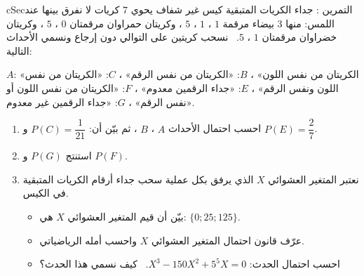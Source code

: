 \documentclass[12pt,a4paper]{article}
\newenvironment{BOX}[2]{\begin{otherlanguage}{english}\begin{arbox}{#1}{#2}}{\end{arbox}\end{otherlanguage}}
\newcounter{exo}
\newenvironment{tamrin}[1]{\stepcounter{exo}\begin{BOX}{cSec}{التمرين \theexo: #1}}{\end{BOX}}
\newenvironment{sq}{\begin{itemize}[leftmargin=2.4em,itemsep=3pt]}{\end{itemize}}
\newcommand{\qa}{\item[(أ)]}\newcommand{\qb}{\item[(ب)]}\newcommand{\qc}{\item[(جـ)]}\newcommand{\qd}{\item[(د)]}\newcommand{\qe}{\item[(هـ)]}
\begin{document}
\begin{tamrin}{جداء الكريات المتبقية}
كيس غير شفاف يحوي $7$ كريات لا نفرق بينها عند اللمس: منها $3$ بيضاء مرقمة $1$ ، $1$ ، $5$ ، وكريتان حمراوان مرقمتان $0$ ، $5$ ، وكريتان خضراوان مرقمتان $1$ ، $5$. \ نسحب كريتين على التوالي دون إرجاع ونسمي الأحداث التالية:\par
$A$: «الكريتان من نفس اللون» ، $B$: «الكريتان من نفس الرقم» ، $C$: «الكريتان من نفس اللون ونفس الرقم» ، $E$: «جداء الرقمين معدوم» ، $F$: «الكريتان من نفس اللون أو نفس الرقم» ، $G$: «جداء الرقمين غير معدوم».
\begin{enumerate}
\item احسب احتمال الأحداث $A$ ، $B$ ، ثم بيّن أن: $P(C)=\dfrac{1}{21}$ و $P(E)=\dfrac27$.
\item استنتج $P(G)$ و $P(F)$.
\item نعتبر المتغير العشوائي $X$ الذي يرفق بكل عملية سحب جداء أرقام الكريات المتبقية في الكيس.
\begin{sq}
\qa بيّن أن قيم المتغير العشوائي $X$ هي: $\{0;25;125\}$.
\qb عرّف قانون احتمال المتغير العشوائي $X$ واحسب أمله الرياضياتي.
\qc احسب احتمال الحدث: $X^3-150X^2+5^5X=0$. \ كيف نسمي هذا الحدث؟
\end{sq}
\end{enumerate}
\end{tamrin}
\end{document}
